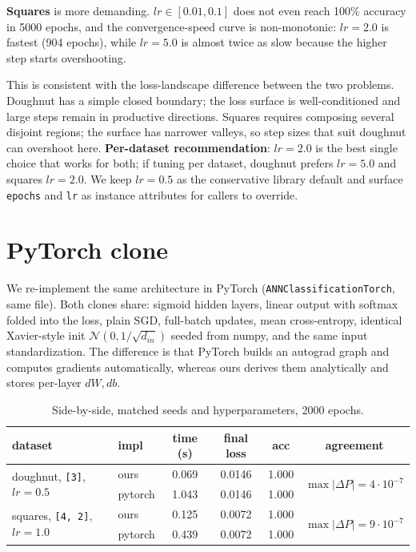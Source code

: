 \documentclass[10pt, a4paper]{article}
\begin{document}
\textbf{Squares} is more demanding. \(lr \in [0.01, 0.1]\) does not even reach 100\% accuracy in 5000 epochs, and the convergence-speed curve is non-monotonic: \(lr=2.0\) is fastest (904 epochs), while \(lr=5.0\) is almost twice as slow because the higher step starts overshooting.

This is consistent with the loss-landscape difference between the two problems. Doughnut has a simple closed boundary; the loss surface is well-conditioned and large steps remain in productive directions. Squares requires composing several disjoint regions; the surface has narrower valleys, so step sizes that suit doughnut can overshoot here. \textbf{Per-dataset recommendation}: \(lr=2.0\) is the best single choice that works for both; if tuning per dataset, doughnut prefers \(lr=5.0\) and squares \(lr=2.0\). We keep \(lr=0.5\) as the conservative library default and surface \texttt{epochs} and \texttt{lr} as instance attributes for callers to override.

\section{PyTorch clone}

We re-implement the same architecture in PyTorch (\texttt{ANNClassificationTorch}, same file). Both clones share: sigmoid hidden layers, linear output with softmax folded into the loss, plain SGD, full-batch updates, mean cross-entropy, identical Xavier-style init \(\mathcal{N}(0, 1/\sqrt{d_{in}})\) seeded from numpy, and the same input standardization. The difference is that PyTorch builds an autograd graph and computes gradients automatically, whereas ours derives them analytically and stores per-layer \(dW, db\).

\begin{table}[h]
\centering
\caption{Side-by-side, matched seeds and hyperparameters, 2000 epochs.}
\label{tab:torch}
\begin{tabular}{llcccc}
\toprule
dataset & impl & time (s) & final loss & acc & agreement \\
\midrule
\multirow{2}{*}{doughnut, \texttt{[3]}, \(lr=0.5\)}
& ours    & 0.069 & 0.0146 & 1.000 & \multirow{2}{*}{\(\max|\Delta P|=4\!\cdot\!10^{-7}\)} \\
& pytorch & 1.043 & 0.0146 & 1.000 & \\
\midrule
\multirow{2}{*}{squares, \texttt{[4, 2]}, \(lr=1.0\)}
& ours    & 0.125 & 0.0072 & 1.000 & \multirow{2}{*}{\(\max|\Delta P|=9\!\cdot\!10^{-7}\)} \\
& pytorch & 0.439 & 0.0072 & 1.000 & \\
\bottomrule
\end{tabular}
\end{table}
\end{document}
